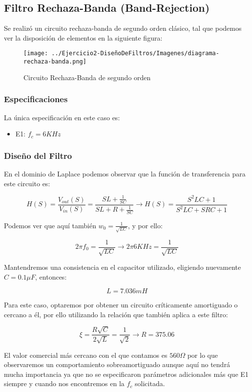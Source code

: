 \subsection{Filtro Rechaza-Banda (Band-Rejection)}

Se realizó un circuito rechaza-banda de segundo orden clásico, tal que podemos
ver la disposición de elementos en la siguiente figura:

\begin{figure}[H]
    \centering
    \texttt{[image: ../Ejercicio2-DiseñoDeFiltros/Imagenes/diagrama-rechaza-banda.png]}
    \caption{Circuito Rechaza-Banda de segundo orden}
\end{figure}

\subsubsection{Especificaciones}

La única especificación en este caso es:

\begin{itemize}
	\item E1: $f_c=6 KHz$
\end{itemize}

\subsubsection{Diseño del Filtro}

En el dominio de Laplace podemos observar que la función de transferencia para este circuito es:

$$H(S)=\frac{V_{out}(S)}{V_{in}(S)}=\frac{SL+\frac{1}{SC}}{SL+R+\frac{1}{SC}} \longrightarrow H(S)=\frac{S^{2}LC+1}{S^2LC+SRC+1}$$

Podemos ver que aquí también $w_0=\frac{1}{\sqrt{LC}}$, y por ello:

$$2 \pi f_0 = \frac{1}{\sqrt{LC}} \longrightarrow 2 \pi 6KHz = \frac{1}{\sqrt{LC}}$$

Mantendremos una consistencia en el capacitor utilizado, eligiendo nuevamente $C=0.1 \mu F$, entonces:

$$L = 7.036 mH$$

Para este caso, optaremos por obtener un circuito críticamente amortiguado o cercano a él, por ello utilizando la relación que también aplica a este
filtro:

$$\xi=\frac{R \sqrt{C}}{2\sqrt{L}}=\frac{1}{\sqrt{2}} \longrightarrow R=375.06$$

El valor comercial más cercano con el que contamos es $560 \Omega$ por lo que observaremos un comportamiento sobreamortiguado aunque aquí
no tendrá mucha importancia ya que no se especificaron parámetros adicionales más que E1 siempre y cuando nos encontremos en la $f_c$ solicitada.

